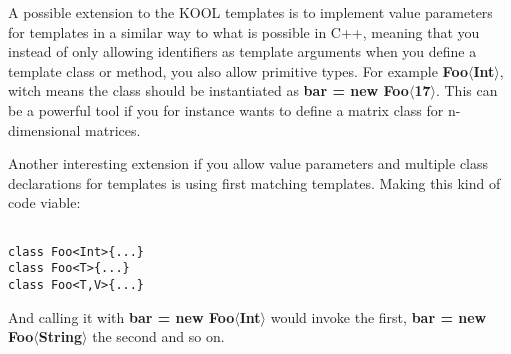 A possible extension to the KOOL templates is to implement value parameters for
templates in a similar way to what is possible in C++, meaning that you instead
of only allowing identifiers as template arguments when you define a template
class or method, you also allow primitive types. For example
\textbf{Foo$\langle$Int$\rangle$}, witch means the class should be instantiated
as \textbf{bar = new Foo$\langle$17$\rangle$}. This can be a powerful tool if
you for instance wants to define a matrix class for n-dimensional matrices.

Another interesting extension if you allow value parameters and multiple
class declarations for templates is using first matching templates. Making
this kind of code viable:

\begin{lstlisting}

class Foo<Int>{...}
class Foo<T>{...}
class Foo<T,V>{...}

\end{lstlisting}

And calling it with \textbf{bar = new Foo$\langle$Int$\rangle$} would invoke
the first, \textbf{bar = new Foo$\langle$String$\rangle$} the second and so on.
